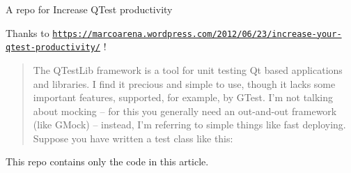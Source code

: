 A repo for Increase Q\-Test productivity

Thanks to \href{https://marcoarena.wordpress.com/2012/06/23/increase-your-qtest-productivity/}{\tt https\-://marcoarena.\-wordpress.\-com/2012/06/23/increase-\/your-\/qtest-\/productivity/} ! \begin{quotation}
The Q\-Test\-Lib framework is a tool for unit testing Qt based applications and libraries. I find it precious and simple to use, though it lacks some important features, supported, for example, by G\-Test. I’m not talking about mocking – for this you generally need an out-\/and-\/out framework (like G\-Mock) – instead, I’m referring to simple things like fast deploying. Suppose you have written a test class like this\-:

\end{quotation}


This repo contains only the code in this article. 